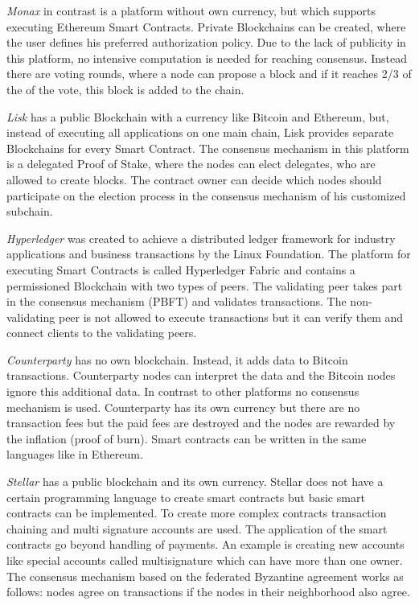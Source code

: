 \documentclass[conference]{IEEEtran}
\begin{document}
\textit{Monax} in contrast is a platform without own currency, but which supports executing Ethereum Smart Contracts. Private Blockchains can be created, where the user defines his preferred authorization policy. Due to the lack of publicity in this platform, no intensive computation is needed for reaching consensus. Instead there are voting rounds, where a node can propose a block and if it reaches 2/3 of the of the vote, this block is added to the chain. \cite{Bartoletti2017} \par 
\textit{Lisk} has a public Blockchain with a currency like Bitcoin and Ethereum, but, instead of executing all applications on one main chain, Lisk provides separate Blockchains for every Smart Contract. The consensus mechanism in this platform is a delegated Proof of Stake, where the nodes can elect delegates, who are allowed to create blocks. The contract owner can decide which nodes should participate on the election process in the consensus mechanism of his customized subchain. \cite{Bartoletti2017} \par 
\textit{Hyperledger} was created to achieve a distributed ledger framework for industry applications and business transactions by the Linux Foundation. The platform for executing Smart Contracts is called Hyperledger Fabric and contains a permissioned Blockchain with two types of peers. The validating peer takes part in the consensus mechanism (PBFT) and validates transactions. The non-validating peer is not allowed to execute transactions but it can verify them and connect clients to the validating peers.\cite{Cachin2016} \par 
\textit{Counterparty} has no own blockchain. Instead, it adds data to Bitcoin transactions. Counterparty nodes can interpret the data and the Bitcoin nodes ignore this additional data. In contrast to other platforms no consensus mechanism is used. Counterparty has its own currency but there are no transaction fees but the paid fees are destroyed and the nodes are rewarded by the inflation (proof of burn). Smart contracts can be written in the same languages like in Ethereum. \cite{Bartoletti2017} \par 
\textit{Stellar} has a public blockchain and its own currency. Stellar does not have a certain programming language to create smart contracts but basic smart contracts can be implemented. To create more complex contracts transaction chaining and multi signature accounts are used. The application of the smart contracts go beyond handling of payments. An example is creating new accounts like special accounts called multisignature which can have more than one owner. The consensus mechanism based on the federated Byzantine agreement works as follows: nodes agree on transactions if the nodes in their neighborhood also agree.\cite{Bartoletti2017} \par 
\end{document}
